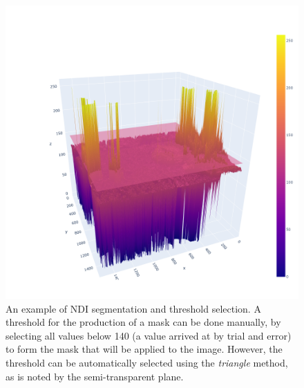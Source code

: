 \documentclass[letterpaper, notitlepage]{report}
\begin{document}
{\begin{figure}[H]
	\centering
	\includegraphics[width=\linewidth]{./figures/ndi-1-of-2.png}
	\caption[Image segmented using NDI]{An example of NDI segmentation and threshold selection. A threshold for the production of a mask can be done manually,  by selecting all values below 140 (a value arrived at by trial and error) to form the mask that will be applied to the image. However, the threshold can be automatically selected using the \textit{triangle} method, as is noted by the semi-transparent plane.}
	\label{fig:ndi-segmentation}
\end{figure}


}
\end{document}
